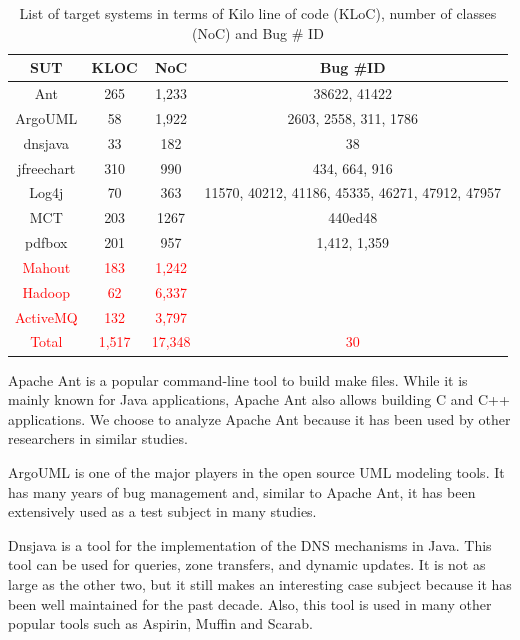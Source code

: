 \documentclass[times]{smrauth}
\newcommand{\red}[1]{\textcolor{red}{#1}}
\begin{document}
\begin{table}[h!]
\centering

\caption{List of target systems in terms of Kilo line of code (KLoC), number of classes (NoC) and Bug \# ID}
\begin{tabular}{c|c|c|c}
SUT        & KLOC & NoC  & Bug \#ID                                        \\ \hline \hline
Ant        & 265  & 1,233 & 38622, 41422                                    \\
ArgoUML    & 58   & 1,922 & 2603, 2558, 311, 1786                           \\
dnsjava    & 33   & 182  & 38                                              \\
jfreechart & 310  & 990  & 434, 664, 916                                   \\
Log4j      & 70   & 363  & 11570, 40212, 41186, 45335, 46271, 47912, 47957 \\
MCT        & 203  & 1267 & 440ed48                                         \\
pdfbox     & 201  & 957  & 1,412, 1,359 \\ 
\red{Mahout} & \red{183} & \red{1,242} \\
\red{Hadoop} & \red{62} & \red{6,337} \\
\red{ActiveMQ} & \red{132} & \red{3,797} \\ \hline 
\red{Total} & \red{1,517} & \red{17,348} & \red{30} \\ 
\hline \hline 
\end{tabular}
\label{tab:jacharming-systems}
\end{table}

Apache Ant \cite{ApacheSoftwareFoundation} is a popular command-line tool to build
make files. While it is mainly known for Java applications,
Apache Ant also allows building C and C++ applications. We
choose to analyze Apache Ant because it has been used by
other researchers in similar studies.

ArgoUML \cite{CollabNet} is one of the major players in the open source
UML modeling tools. It has many years of bug management
and, similar to Apache Ant, it has been extensively used as a
test subject in many studies.

Dnsjava \cite{Wellington2013} is a tool for the implementation of the DNS
mechanisms in Java. This tool can be used for queries, zone
transfers, and dynamic updates. It is not as large as the other
two, but it still makes an interesting case subject because it has
been well maintained for the past decade. Also, this tool is
used in many other popular tools such as Aspirin, Muffin and
Scarab.
\end{document}
